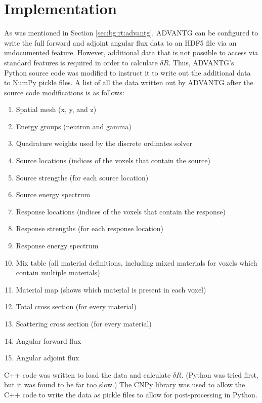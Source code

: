 \section{Implementation}
\label{sec:dr:implementation}

As was mentioned in Section \ref{sec:bg:rt:advantg}, ADVANTG can be configured to write the full forward and adjoint angular flux data to an HDF5 file via an undocumented feature.
However, additional data that is not possible to access via standard features is required in order to calculate $\delta R$.
Thus, ADVANTG's Python source code was modified to instruct it to write out the additional data to NumPy \cite{numpy} pickle files.
A list of all the data written out by ADVANTG after the source code modifications is as follows:

\begin{enumerate}
  \item Spatial mesh (x, y, and z)
  \item Energy groups (neutron and gamma)
  \item Quadrature weights used by the discrete ordinates solver
  \item Source locations (indices of the voxels that contain the source)
  \item Source strengths (for each source location)
  \item Source energy spectrum
  \item Response locations (indices of the voxels that contain the response)
  \item Response strengths (for each response location)
  \item Response energy spectrum
  \item Mix table (all material definitions, including mixed materials for voxels which contain multiple materials)
  \item Material map (shows which material is present in each voxel)
  \item Total cross section (for every material)
  \item Scattering cross section (for every material)
  \item Angular forward flux
  \item Angular adjoint flux
\end{enumerate}

C++ code was written to load the data and calculate $\delta R$.
(Python was tried first, but it was found to be far too slow.)
The CNPy \cite{cnpy} library was used to allow the C++ code to write the data as pickle files to allow for post-processing in Python.
